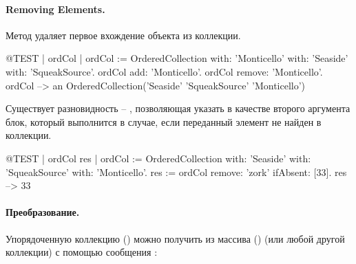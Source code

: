 \documentclass[a4paper,10pt,twoside]{book}
\begin{document}
\paragraph{Removing Elements.} Метод   удаляет первое вхождение объекта из коллекции.

\begin{code}{@TEST | ordCol | ordCol := OrderedCollection with: 'Monticello' with: 'Seaside' with: 'SqueakSource'.}
ordCol add: 'Monticello'.
ordCol remove: 'Monticello'.
ordCol --> an OrderedCollection('Seaside' 'SqueakSource' 'Monticello')
\end{code}

Существует разновидность  -- , позволяющая указать
в качестве второго аргумента блок, который выполнится в случае, если переданный элемент не найден в коллекции.

\begin{code}{@TEST | ordCol res | ordCol := OrderedCollection with: 'Seaside' with: 'SqueakSource' with: 'Monticello'.}
res := ordCol remove: 'zork' ifAbsent: [33].
res --> 33
\end{code}

\paragraph{Преобразование.}
Упорядоченную коллекцию () можно получить из массива () (или любой другой коллекции) с помощью сообщения :
\end{document}
